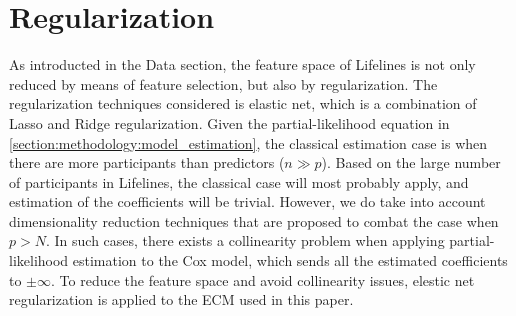 


\section{Regularization}
\label{section:methodology:regularization}
As introducted in the Data section, the feature space of Lifelines is not only reduced by means of feature selection, but also by regularization. The regularization techniques considered is elastic net, which is a combination of Lasso and Ridge regularization. Given the partial-likelihood equation in \ref{section:methodology:model_estimation}, the classical estimation case is when there are more participants than predictors ($n \gg p$). Based on the large number of participants in Lifelines, the classical case will most probably apply, and estimation of the coefficients will be trivial. However, we do take into account dimensionality reduction techniques that are proposed to combat the case when $p > N$. In such cases, there exists a collinearity problem when applying partial-likelihood estimation to the Cox model, which sends all the estimated coefficients to $ \pm \infty$. To reduce the feature space and avoid collinearity issues, elestic net regularization is applied to the ECM used in this paper. 

